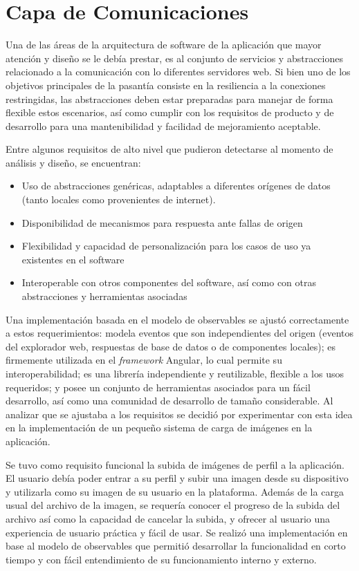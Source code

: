 \section{Capa de Comunicaciones}

Una de las áreas de la arquitectura de software de la aplicación que mayor atención y diseño se le debía prestar, es al conjunto de servicios y abstracciones relacionado a la comunicación con lo diferentes servidores web. Si bien uno de los objetivos principales de la pasantía consiste en la resiliencia a la conexiones restringidas, las abstracciones deben estar preparadas para manejar de forma flexible estos escenarios, así como cumplir con los requisitos de producto y de desarrollo para una mantenibilidad y facilidad de mejoramiento aceptable.

Entre algunos requisitos de alto nivel que pudieron detectarse al momento de análisis y diseño, se encuentran:

\begin{itemize}
  \item Uso de abstracciones genéricas, adaptables a diferentes orígenes de datos (tanto locales como provenientes de internet).
  \item Disponibilidad de mecanismos para respuesta ante fallas de origen
  \item Flexibilidad y capacidad de personalización para los casos de uso ya existentes en el software
  \item Interoperable con otros componentes del software, así como con otras abstracciones y herramientas asociadas
\end{itemize}

Una implementación basada en el modelo de observables se ajustó correctamente a estos requerimientos: modela eventos que son independientes del origen (eventos del explorador web, respuestas de base de datos o de componentes locales); es firmemente utilizada en el \textit{framework} Angular, lo cual permite su interoperabilidad; es una librería independiente y reutilizable, flexible a los usos requeridos; y posee un conjunto de herramientas asociados para un fácil desarrollo, así como una comunidad de desarrollo de tamaño considerable. Al analizar que se ajustaba a los requisitos se decidió por experimentar con esta idea en la implementación de un pequeño sistema de carga de imágenes en la aplicación.

Se tuvo como requisito funcional la subida de imágenes de perfil a la aplicación. El usuario debía poder entrar a su perfil y subir una imagen desde su dispositivo y utilizarla como su imagen de su usuario en la plataforma. Además de la carga usual del archivo de la imagen, se requería conocer el progreso de la subida del archivo así como la capacidad de cancelar la subida, y ofrecer al usuario una experiencia de usuario práctica y fácil de usar. Se realizó una implementación en base al modelo de observables que permitió desarrollar la funcionalidad en corto tiempo y con fácil entendimiento de su funcionamiento interno y externo.

